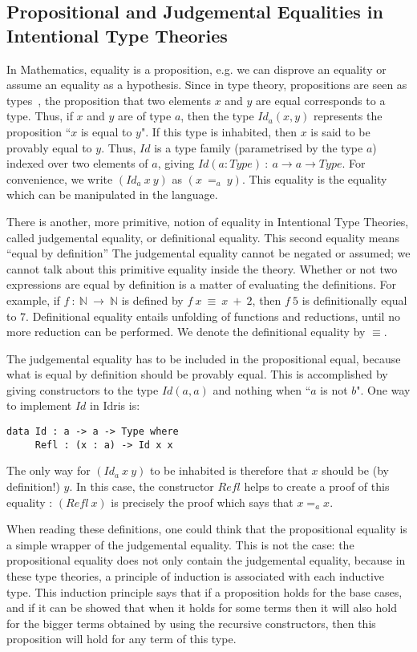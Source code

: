 \subsection{Propositional and Judgemental Equalities in Intentional Type Theories}
In Mathematics, equality is a proposition, e.g. we can disprove an equality or 
assume an equality as a hypothesis.
Since in type theory, propositions are seen as types~\cite{How80}, the
proposition that two elements $x$ and $y$ are equal corresponds to a type.
Thus, if $x$ and $y$ are of type $a$, then the type
$Id_a(x, y)$ represents the proposition ``$x$ is equal to $y$". If this type is
inhabited, then $x$ is said to be provably equal to $y$.  Thus, $Id$ is a type
family (parametrised by the type $a$) indexed over two elements of $a$, giving
$Id (a:Type)\ :\ a \rightarrow a \rightarrow Type$. For
convenience, we write $(Id_a\ x\ y)$ as $(x\ =_a\ y)$. This equality is the
equality which can be manipulated in the language. 

There is another, more
primitive, notion of equality in Intentional Type Theories, called judgemental
equality, or definitional equality. This second equality means ``equal by
definition'' The judgemental equality cannot be negated or
assumed; we cannot talk about this primitive equality inside the theory.
Whether or not two expressions are equal by definition is a matter of
evaluating the definitions. For example, if $f\ :\ \mathbb{N}\ \rightarrow\
\mathbb{N}$ is defined by $f\ x\ \equiv\ x\ +\ 2$, then $f\ 5$ is
definitionally equal to $7$. Definitional equality entails unfolding
of functions and reductions, until no more reduction can be
performed. We denote the definitional equality by $\equiv$.

The judgemental equality has to be included in the propositional equal, because
what is equal by definition should be provably equal.  This is accomplished by
giving constructors to the type $Id(a,a)$ and nothing when ``$a$ is not $b$".
One way to implement $Id$ in Idris is:

\begin{lstlisting}
data Id : a -> a -> Type where
     Refl : (x : a) -> Id x x
\end{lstlisting}

The only way for $(Id_a\ x\ y)$ to be inhabited is therefore that $x$ should be
(by definition!) $y$. In this case, the constructor $Refl$ helps to create a
proof of this equality : $(Refl\ x)$ is precisely the proof which says that
$x=_ax$. 

When reading these definitions, one could think that the
propositional equality is a simple wrapper of the judgemental equality. This is
not the case: the propositional equality does not only contain the judgemental
equality, because in these type theories, a principle of induction is
associated with each inductive type. This induction principle says that if a
proposition holds for the base cases, and if it can be showed that when it
holds for some terms then it will also hold for the bigger terms obtained by
using the recursive constructors, then this proposition will hold for any term
of this type.

